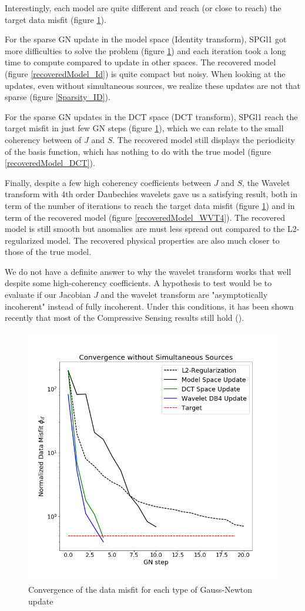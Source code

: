 \documentclass[twoside]{article}
\begin{document}
\newpage

Interestingly, each model are quite different and reach (or close to reach) the target data misfit (figure \ref{Convergence}).

For the sparse GN update in the model space (Identity transform), SPGl1 got more difficulties to solve the problem (figure \ref{Convergence}) and each iteration took a long time to compute compared to update in other spaces. The recovered model (figure \ref{recoveredModel_Id}) is quite compact but noisy. When looking at the updates, even without simultaneous sources, we realize these updates are not that sparse (figure \ref{Sparsity_ID}).

For the sparse GN updates in the DCT space (DCT transform), SPGl1 reach the target misfit in just few GN steps (figure \ref{Convergence}), which we can relate to the small coherency between of $J$ and $S$. The recovered model still displays the periodicity of the basis function, which has nothing to do with the true model (figure \ref{recoveredModel_DCT}).

Finally, despite a few high coherency coefficients between $J$ and $S$, the Wavelet transform with 4th order Daubechies wavelets gave us a satisfying result, both in term of the number of iterations to reach the target data misfit (figure \ref{Convergence}) and in term of the recovered model (figure \ref{recoveredModel_WVT4}). The recovered model is still smooth but anomalies are must less spread out compared to the L2-regularized model. The recovered physical properties are also much closer to those of the true model.

We do not have a definite answer to why the wavelet transform works that well despite some high-coherency coefficients. A hypothesis to test would be to evaluate if our Jacobian $J$ and the wavelet transform are "asymptotically incoherent" instead of fully incoherent. Under this conditions, it has been shown recently that most of the Compressive Sensing results still hold (\cite{A2017}).

\begin{figure}[H]
    \centering
    \includegraphics[width=0.4\linewidth]{figures/Convergence_Sparse_withoutW.png}
    \caption{Convergence of the data misfit for each type of Gauss-Newton update}
    \label{Convergence}
\end{figure}
\end{document}
